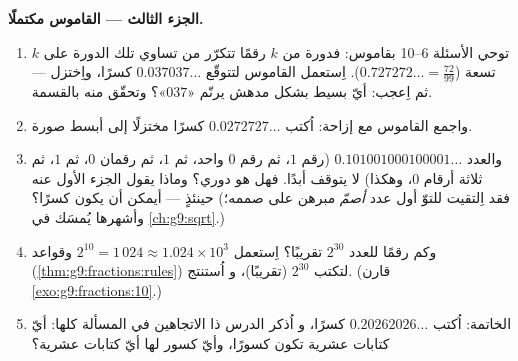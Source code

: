 \begin{problem}
\medskip
\noindent\textbf{الجزء الثالث --- القاموس مكتملًا.}
\begin{enumerate}[resume]
  \item توحي الأسئلة 6--10 بقاموس: فدورة من $k$
        رقمًا تتكرّر من  تساوي تلك الدورة
        على $k$ تسعة ($0.727272\ldots = \frac{72}{99}$). اِستعمل
        القاموس لتتوقّع $0.037037\ldots$ كسرًا،
        واِختزل --- ثم اِعجب: أيّ  بسيط بشكل
        مدهش يرنّم «$037$»؟ وتحقّق منه بالقسمة.
  \item واجمع القاموس مع إزاحة: اُكتب
        $0.0272727\ldots$ كسرًا مختزلًا إلى أبسط صورة.
  \item والعدد $0.101001000100001\ldots$ (رقم $1$، ثم رقم
        $0$ واحد، ثم $1$، ثم رقمان $0$، ثم $1$، ثم ثلاثة
        أرقام $0$، وهكذا) لا يتوقف أبدًا. فهل هو  دوري؟
        وماذا يقول الجزء الأول عنه حينئذٍ --- أيمكن أن يكون
        كسرًا؟ (فقد اِلتقيت للتوّ أول عدد \emph{أصمّ}
        مبرهن على صممه؛ وأشهرها يُمسَك
        في \cref{ch:g9:sqrt}.)
  \item وكم رقمًا للعدد $2^{30}$ تقريبًا؟ اِستعمل
        $2^{10} = 1\,024 \approx 1.024 \times 10^3$ وقواعد
         (\cref{thm:g9:fractions:rules}) لتكتب
        $2^{30}$  (تقريبًا)، و
        اُستنتج. (قارن \cref{exo:g9:fractions:10}.)
  \item الخاتمة: اُكتب $0.20262026\ldots$ كسرًا، و
        اُذكر الدرس ذا الاتجاهين في المسألة كلها: أيّ
        كتابات عشرية تكون كسورًا، وأيّ كسور لها
        أيّ كتابات عشرية؟
\end{enumerate}
\end{problem}

